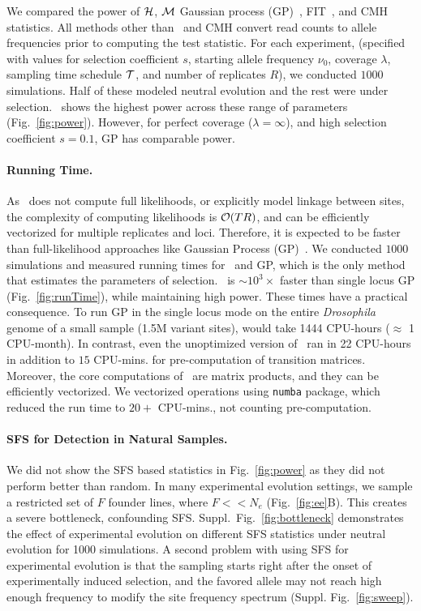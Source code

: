 We compared the power of ${\cal H}$, ${\cal M}$ Gaussian process
(GP)~\cite{Terhorst2015Multi}, FIT~\cite{feder2014Identifying}, and
CMH~\cite{agresti2011categorical} statistics.  All methods other than
\comale\, and CMH convert read counts to allele frequencies prior to
computing the test statistic. For each experiment, (specified with
values for selection coefficient $s$, starting allele frequency
$\nu_0$, coverage $\lambda$, sampling time schedule ${\cal T}$, and
number of replicates $R$), we conducted $1000$ simulations. Half of
these modeled neutral evolution and the rest were under
selection. \comale\ shows the highest power across these range of
parameters (Fig.~\ref{fig:power}). However, for perfect coverage
($\lambda=\infty$), and high selection coefficient $s=0.1$, GP has
comparable power.




\paragraph{Running Time.}
As \comale\ does not compute full likelihoods, or explicitly model
linkage between sites, the complexity of computing likelihoods is
${\cal O}(TR)$, and can be efficiently vectorized for multiple replicates
and loci. Therefore, it is expected to be faster than full-likelihood
approaches like Gaussian Process (GP)~\cite{Terhorst2015Multi}. We
conducted $1000$ simulations and measured running times for \comale\
and GP, which is the only method that estimates the parameters of
selection. \comale\ is $\sim 10^3\times$ faster than single locus GP
(Fig.~\ref{fig:runTime}), while maintaining high power. These times
have a practical consequence. To run GP in the single locus mode on
the entire \emph{Drosophila} genome of a small sample (1.5M variant
sites), would take 1444 CPU-hours ($\approx$ 1 CPU-month). In
contrast, even the unoptimized version of \comale\ ran in 22 CPU-hours
in addition to $15$ CPU-mins. for pre-computation of transition
matrices.  Moreover, the core computations of \comale\ are matrix
products, and they can be efficiently vectorized. We vectorized
operations using \texttt{numba} package, which reduced the run time to
$20+$ CPU-mins., not counting pre-computation.


\paragraph{SFS for Detection in Natural Samples.} We did not show the
SFS based statistics in Fig.~\ref{fig:power} as they did not perform
better than random. In many experimental evolution settings, we sample
a restricted set of $F$ founder lines, where $F<<N_e$
(Fig.~\ref{fig:ee}B). This creates a severe bottleneck, confounding
SFS. Suppl.~Fig.~\ref{fig:bottleneck} demonstrates the effect of
experimental evolution on different SFS statistics under neutral
evolution for 1000 simulations. A second problem with using SFS for
experimental evolution is that the sampling starts right after the
onset of experimentally induced selection, and the favored allele may
not reach high enough frequency to modify the site frequency spectrum
(Suppl. Fig.~\ref{fig:sweep}).

